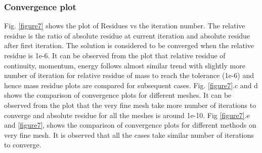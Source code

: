 \documentclass[12pt]{elsarticle}
\begin{document}
	\subsubsection{Convergence plot}
	Fig. \ref{figure7} shows the plot of Residues vs the iteration number. The relative residue is the ratio of absolute residue at current iteration and absolute residue after first iteration. The solution is considered to be converged when the relative residue is 1e-6. It can be observed from the plot that relative residue of continuity, momentum, energy follows almost similar trend with slightly more number of iteration for relative residue of mass to reach the tolerance (1e-6) and hence mass residue plots are compared for subsequent cases. Fig. \ref{figure7}.c  and d shows the comparison of convergence plots for different meshes. It can be observed from the plot that the very fine mesh take more number of iterations to converge and absolute residue for all the meshes is around 1e-10. Fig \ref{figure7}.e and \ref{figure7}, shows the comparison of convergence plots for different methods on very fine mesh. It is observed that all the cases take similar number of iterations to converge.
	
\end{document}
